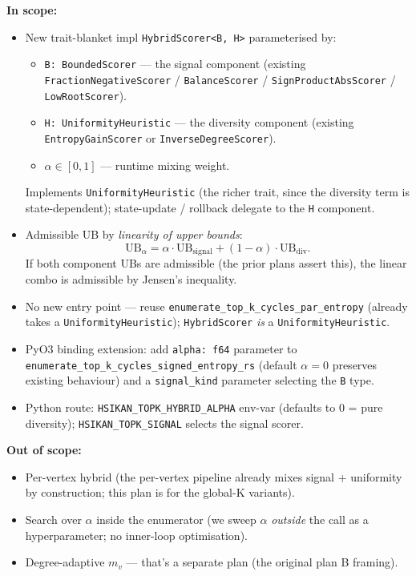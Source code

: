 \documentclass[a4paper,11pt]{article}
\begin{document}
\textbf{In scope:}
\begin{itemize}
  \item New trait-blanket impl \texttt{HybridScorer<B, H>}
    parameterised by:
    \begin{itemize}
      \item \texttt{B: BoundedScorer} — the signal component (existing
        \texttt{FractionNegativeScorer} / \texttt{BalanceScorer} /
        \texttt{SignProductAbsScorer} / \texttt{LowRootScorer}).
      \item \texttt{H: UniformityHeuristic} — the diversity component
        (existing \texttt{EntropyGainScorer} or
        \texttt{InverseDegreeScorer}).
      \item $\alpha \in [0, 1]$ — runtime mixing weight.
    \end{itemize}
    Implements \texttt{UniformityHeuristic} (the richer trait, since
    the diversity term is state-dependent); state-update / rollback
    delegate to the \texttt{H} component.
  \item Admissible UB by \emph{linearity of upper bounds}:
    \[
      \mathrm{UB}_\alpha = \alpha \cdot \mathrm{UB}_\mathrm{signal}
      + (1 - \alpha) \cdot \mathrm{UB}_\mathrm{div}.
    \]
    If both component UBs are admissible (the prior plans assert
    this), the linear combo is admissible by Jensen's inequality.
  \item No new entry point — reuse
    \texttt{enumerate\_top\_k\_cycles\_par\_entropy} (already takes a
    \texttt{UniformityHeuristic}); \texttt{HybridScorer} \emph{is} a
    \texttt{UniformityHeuristic}.
  \item PyO3 binding extension: add \texttt{alpha: f64} parameter to
    \texttt{enumerate\_top\_k\_cycles\_signed\_entropy\_rs}
    (default $\alpha = 0$ preserves existing behaviour) and a
    \texttt{signal\_kind} parameter selecting the \texttt{B} type.
  \item Python route: \texttt{HSIKAN\_TOPK\_HYBRID\_ALPHA} env-var
    (defaults to 0 = pure diversity); \texttt{HSIKAN\_TOPK\_SIGNAL}
    selects the signal scorer.
\end{itemize}

\textbf{Out of scope:}
\begin{itemize}
  \item Per-vertex hybrid (the per-vertex pipeline already mixes
    signal + uniformity by construction; this plan is for the
    global-K variants).
  \item Search over $\alpha$ inside the enumerator (we sweep $\alpha$
    \emph{outside} the call as a hyperparameter; no inner-loop
    optimisation).
  \item Degree-adaptive $m_v$ — that's a separate plan (the original
    plan B framing).
\end{itemize}
\end{document}
